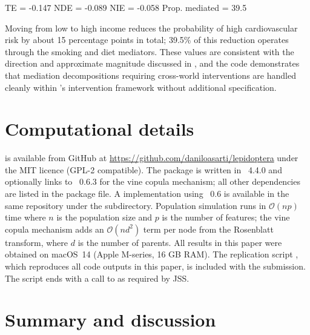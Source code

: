 \documentclass[article]{jss}
\begin{document}
\begin{CodeOutput}
TE = -0.147  NDE = -0.089  NIE = -0.058  Prop. mediated = 39.5%
\end{CodeOutput}

\noindent
Moving from low to high income reduces the probability of high cardiovascular risk
by about 15 percentage points in total; 39.5\% of this reduction operates through
the smoking and diet mediators. These values are consistent with the direction and
approximate magnitude discussed in \citet{vanderweele2015explanation}, and the
code demonstrates that mediation decompositions requiring cross-world interventions
are handled cleanly within 's intervention framework without
additional specification.

\section{Computational details}
\label{sec:computational}

 is available from GitHub at
\url{https://github.com/daniloasarti/lepidoptera} under the MIT licence (GPL-2
compatible). The package is written in ~4.4.0
\citep{rcore2024} and optionally links to ~0.6.3
\citep{nagler2022rvinecopulib} for the vine copula mechanism; all other
dependencies are listed in the package  file. A
 implementation using ~0.6
\citep{pyvinecopulib2024} is available in the same repository under the
 subdirectory. Population simulation runs in $\mathcal{O}(np)$ time
where $n$ is the population size and $p$ is the number of features; the vine
copula mechanism adds an $\mathcal{O}(n d^2)$ term per node from the Rosenblatt
transform, where $d$ is the number of parents. All results in this paper were
obtained on macOS~14 (Apple M-series, 16 GB RAM). The replication script
, which reproduces all code outputs in this paper, is
included with the submission. The script ends with a call to  as
required by JSS.

\section{Summary and discussion}
\label{sec:discussion}
\end{document}
